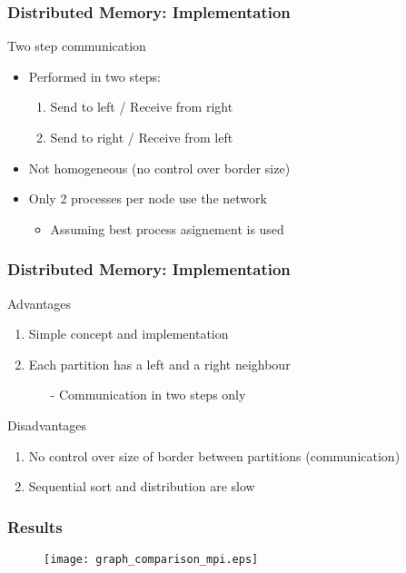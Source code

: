 \begin{frame}
	\frametitle{Distributed Memory: Implementation}

	\begin{block}{Two step communication}
		\begin{itemize}\itemsep=20pt
			\item Performed in two steps:
			\begin{enumerate}\itemsep=10pt
				\item Send to left / Receive from right
				\item Send to right / Receive from left
			\end{enumerate}

			\item Not homogeneous (no control over border size)

			\item Only 2 processes per node use the network
			\begin{itemize}
				\item Assuming best process asignement is used
			\end{itemize}
		\end{itemize}
	\end{block}
\end{frame}

\begin{frame}
\frametitle{Distributed Memory: Implementation}

	\begin{block}{Advantages}
		\begin{enumerate}\itemsep=10pt
			\item Simple concept and implementation
			\item Each partition has a left and a right neighbour
			\begin{itemize}
				\item[-] Communication in two steps only
			\end{itemize}
		\end{enumerate}
	\end{block}

	\begin{block}{Disadvantages}
		\begin{enumerate}\itemsep=10pt
			\item No control over size of border between partitions (communication)
			\item Sequential sort and distribution are slow
		\end{enumerate}
	\end{block}

\end{frame}

\begin{frame}
	\frametitle{Results}
	\begin{figure}
		\centering
		\texttt{[image: graph\_comparison\_mpi.eps]}
	\end{figure}
\end{frame}

